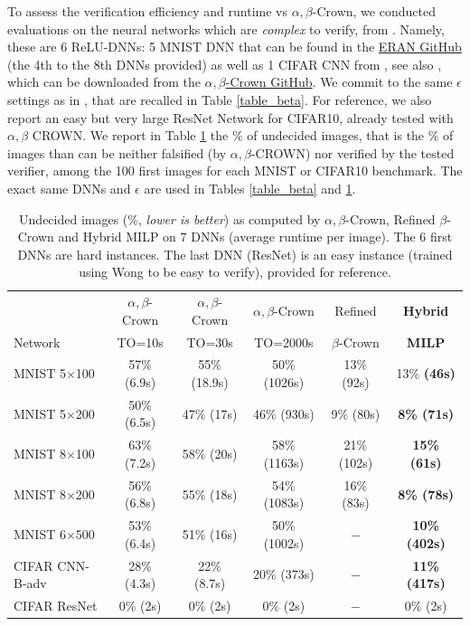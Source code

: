 To assess the verification efficiency and runtime vs $\alpha,\beta$-Crown, we 
conducted evaluations on the neural networks which are {\em complex} to verify, from \cite{crown}. Namely, these are 6 ReLU-DNNs: 5 MNIST DNN that can be found in the \href{https://github.com/eth-sri/eran}{ERAN GitHub} 
(the 4th to the 8th DNNs provided) as well as 1 CIFAR CNN from 
\cite{AdversarialTrainingAndProvableDefenses}, see also \cite{SDPFI}, 
which can be downloaded from the \href{https://github.com/Verified-Intelligence/alpha-beta-CROWN}{$\alpha,\beta$-Crown GitHub}. 
We commit to the same $\epsilon$ settings as in \cite{crown}, that are recalled in Table \ref{table_beta}. 
For reference, we also report an easy but very large ResNet Network for CIFAR10, already tested with $\alpha,\beta$ CROWN. 
We report in Table \ref{table_hybrid} the $\%$ of undecided images, that is the $\%$ of images than can be neither falsified (by $\alpha,\beta$-CROWN) nor verified by the tested verifier, among the 100 first images for each MNIST or CIFAR10 benchmark. 
The exact same DNNs and $\epsilon$ are used in Tables \ref{table_beta} and \ref{table_hybrid}.


\begin{table}[t!]
	\centering
	\begin{tabular}{||l||c|c|c||c||c||}
		\hline \hline
		 & $\alpha,\beta$-Crown & $\alpha,\beta$-Crown & $\alpha,\beta$-Crown & Refined & \bf Hybrid \\ 
		 Network & TO=10s & TO=30s & TO=2000s & $\beta$-Crown & \bf MILP \\ 
		\hline
		MNIST 5$\times$100 & 57\% (6.9s) & 55\% (18.9s) & 50\% (1026s) & 13\% 
		(92s) & 13\% \bf (46s) \\ \hline
		MNIST 5$\times$200 & 50\% (6.5s) & 47\% (17s) & 46\% (930s) & 9\% (80s) & \bf 8\% (71s) \\ \hline
		MNIST 8$\times$100 & 63\% (7.2s) & 58\% (20s) & 58\% (1163s) & 21\% (102s) & \bf 15\% (61s) \\ \hline
		MNIST 8$\times$200 & 56\% (6.8s) & 55\% (18s) & 54\% (1083s) & 16\% (83s) & \bf 8\% (78s) \\ \hline
		MNIST 6$\times$500 & 53\% (6.4s) & 51\% (16s) & 50\% (1002s) & $-$ & 
		\bf 10\% (402s) \\ \hline
		CIFAR CNN-B-adv & 28\% (4.3s) & 22\% (8.7s) & 20\% (373s) & $-$ & \bf 11\% (417s) \\ \hline \hline
		CIFAR ResNet & 0\% (2s) & 0\% (2s) & 0\% (2s) & $-$ & 0\% (2s) \\ \hline \hline
	\end{tabular}
	\caption{Undecided images ($\%$, {\em lower is better}) as computed by $\alpha,\beta$-Crown, Refined $\beta$-Crown and Hybrid MILP on 7 DNNs (average runtime per image). The 6 first DNNs are hard instances. The last DNN (ResNet) is an easy instance (trained using Wong to be easy to verify), provided for reference.
	\vspace{-1cm}}
	\label{table_hybrid}
	\end{table}

